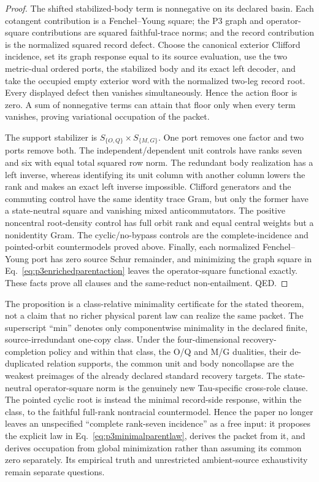 \begin{proof}
The shifted stabilized-body term is nonnegative on its declared basin.  Each
cotangent contribution is a Fenchel--Young square; the P3 graph and
operator-square contributions are squared faithful-trace norms; and the
record contribution is the normalized squared record defect.  Choose the
canonical exterior Clifford incidence, set its graph response equal to its
source evaluation, use the two metric-dual ordered ports, the stabilized body
and its exact left decoder, and take the occupied empty exterior word with
the normalized two-leg record root.  Every displayed defect then vanishes
simultaneously.  Hence the action floor is zero.  A sum of nonnegative terms
can attain that floor only when every term vanishes, proving variational
occupation of the packet.

The support stabilizer is
$S_{\{O,Q\}}\times S_{\{M,G\}}$.  One port removes one factor and two ports
remove both.  The independent/dependent unit controls have ranks seven and
six with equal total squared row norm.  The redundant body realization has a
left inverse, whereas identifying its unit column with another column lowers
the rank and makes an exact left inverse impossible.  Clifford generators and
the commuting control have the same identity trace Gram, but only the former
have a state-neutral square and vanishing mixed anticommutators.  The
positive noncentral root-density control has full orbit rank and equal central
weights but a nonidentity Gram.  The cyclic/no-bypass controls are the
complete-incidence and pointed-orbit countermodels proved above.  Finally,
each normalized Fenchel--Young port has zero source Schur remainder, and
minimizing the graph square in Eq.~\eqref{eq:p3enrichedparentaction} leaves
the operator-square functional exactly.  These facts prove all clauses and
the same-reduct non-entailment.  QED.
\end{proof}

The proposition is a class-relative minimality certificate for the stated
theorem, not a claim that no richer physical parent law can realize the same
packet.  The superscript ``min'' denotes only componentwise minimality in the
declared finite, source-irredundant one-copy class.  Under the four-dimensional
recovery-completion policy and within that class, the O/Q and M/G dualities,
their de-duplicated relation supports, the common unit and body noncollapse
are the weakest preimages of the already declared standard recovery targets.
The state-neutral operator-square norm is the genuinely new Tau-specific
cross-role clause.  The pointed cyclic root is instead the minimal
record-side response, within the class, to the faithful full-rank nontracial
countermodel.  Hence the paper no longer leaves an unspecified
``complete rank-seven incidence'' as a free input: it proposes the explicit
law in Eq.~\eqref{eq:p3minimalparentlaw}, derives the packet from it, and
derives occupation from global minimization rather than assuming its common
zero separately.  Its
empirical truth and unrestricted ambient-source exhaustivity remain separate
questions.

